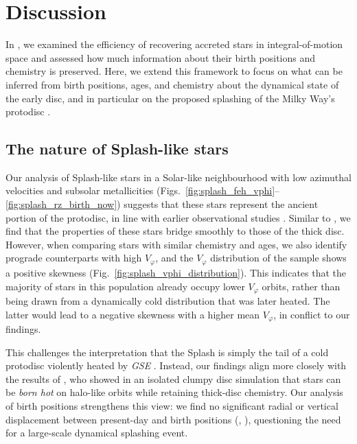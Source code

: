 \documentclass[fleqn,usenatbib]{mnras}
\begin{document}
\section{Discussion}
\label{sec:discussion}

In , we examined the efficiency of recovering accreted stars in integral-of-motion space and assessed how much information about their birth positions and chemistry is preserved. Here, we extend this framework to focus on what can be inferred from birth positions, ages, and chemistry about the dynamical state of the early disc, and in particular on the proposed splashing of the Milky Way's protodisc \citep{Belokurov2020}.

\subsection{The nature of Splash-like stars}

Our analysis of Splash-like stars in a Solar-like neighbourhood with low azimuthal velocities and subsolar metallicities (Figs.~\ref{fig:splash_feh_vphi}--\ref{fig:splash_rz_birth_now}) suggests that these stars represent the ancient portion of the protodisc, in line with earlier observational studies \citep{Bonaca2017, Haywood2018, DiMatteo2019, Gallart2019, Belokurov2020}. Similar to \citet{Belokurov2020}, we find that the properties of these stars bridge smoothly to those of the thick disc. However, when comparing stars with similar chemistry and ages, we also identify prograde counterparts with high $V_\varphi$, and the $V_\varphi$ distribution of the sample shows a positive skewness (Fig.~\ref{fig:splash_vphi_distribution}). This indicates that the majority of stars in this population already occupy lower $V_\varphi$ orbits, rather than being drawn from a dynamically cold distribution that was later heated. The latter would lead to a negative skewness with a higher mean $V_\varphi$, in conflict to our findings.

This challenges the interpretation that the Splash is simply the tail of a cold protodisc violently heated by \textit{GSE} \citep{DiMatteo2019, Belokurov2020}. Instead, our findings align more closely with the results of \citet{Amarante2020}, who showed in an isolated clumpy disc simulation that stars can be \emph{born hot} on halo-like orbits while retaining thick-disc chemistry. Our analysis of birth positions strengthens this view: we find no significant radial or vertical displacement between present-day and birth positions (, ), questioning the need for a large-scale dynamical splashing event.
\end{document}
